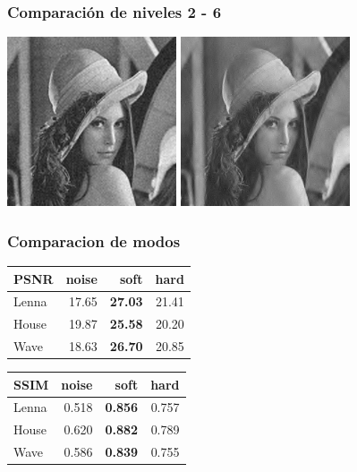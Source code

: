 \documentclass{beamer}
\begin{document}
  \begin{frame}
    \frametitle{Comparación de niveles 2 - 6}
    \centering
    \includegraphics[width=5cm]{imgs/Levels/2_normal_soft_sym8_Lenna.jpg}  
    \includegraphics[width=5cm]{imgs/Levels/6_normal_soft_sym8_Lenna.jpg}
  
  \end{frame}

  \begin{frame}
    \frametitle{ Comparacion de modos }
    \centering
    \begin{tabular}{lrrr}
      \toprule
      {PSNR} &  noise &   soft &   hard \\
      \midrule
      Lenna &  17.65 &  \bf{27.03} &  21.41 \\
      House &  19.87 &  \bf{25.58} &  20.20 \\
      Wave &  18.63 &  \bf{26.70} &  20.85 \\
      \bottomrule
      \end{tabular}
      \begin{tabular}{lrrr}
        {SSIM} &  noise &   soft &   hard \\
        \midrule
        Lenna &  0.518 &  \bf{0.856} &  0.757 \\
        House &  0.620 &  \bf{0.882} &  0.789 \\
        Wave &  0.586 &  \bf{0.839} &  0.755 \\
        \bottomrule
        \end{tabular}

  \end{frame}
\end{document}
